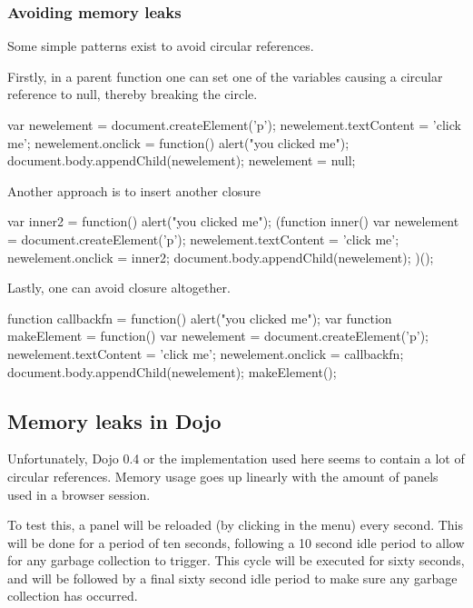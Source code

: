 \subsubsection{Avoiding memory leaks}
Some simple patterns exist to avoid circular references.

Firstly, in a parent function one can set one of the variables causing a
circular reference to null, thereby breaking the circle.
\begin{pyglist}[language=javascript,numbers=left,numbersep=5pt,fontsize=\small]
var newelement = document.createElement('p');
newelement.textContent = 'click me';
newelement.onclick = function() {
  alert("you clicked me");
}
document.body.appendChild(newelement);
newelement = null;
\end{pyglist}

Another approach is to insert another closure
\begin{pyglist}[language=javascript,numbers=left,numbersep=5pt,fontsize=\small]
var inner2 = function() {
  alert("you clicked me");
}
(function inner() {
  var newelement = document.createElement('p');
  newelement.textContent = 'click me';
  newelement.onclick = inner2;
  document.body.appendChild(newelement);
})();
\end{pyglist}

Lastly, one can avoid closure altogether.
\begin{pyglist}[language=javascript,numbers=left,numbersep=5pt,fontsize=\small]
function callbackfn = function() {
  alert("you clicked me");
}
var function makeElement = function() {
  var newelement = document.createElement('p');
  newelement.textContent = 'click me';
  newelement.onclick = callbackfn;
  document.body.appendChild(newelement);
}
makeElement();
\end{pyglist}

\subsection{Memory leaks in Dojo}
\label{Memory leaks in Dojo}
Unfortunately, Dojo 0.4 or the implementation used here seems to contain a lot
of circular references. Memory usage goes up linearly with the amount of panels
used in a browser session.

To test this, a panel will be reloaded (by clicking in the menu) every second.
This will be done for a period of ten seconds, following a 10 second idle period
to allow for any garbage collection to trigger.
This cycle will be executed for sixty seconds, and will be followed by a final
sixty second idle period to make sure any garbage collection has occurred.

